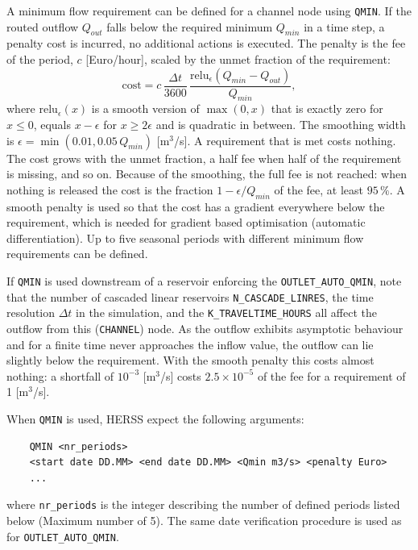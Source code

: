 \documentclass[a4paper, 12pt]{report}
\begin{document}
	A minimum flow requirement can be defined for a channel node using \texttt{QMIN}. If the
	routed outflow $Q_{out}$ falls below the required minimum $Q_{min}$ in a time step, a penalty cost is incurred, no additional actions is executed.
	The penalty is the fee of the period, $c$ [Euro/hour], scaled by the unmet fraction of the requirement:
	\begin{equation}
		\mathrm{cost} = c \, \frac{\Delta t}{3600} \, \frac{\mathrm{relu}_\epsilon(Q_{min} - Q_{out})}{Q_{min}},
	\end{equation}
	where $\mathrm{relu}_\epsilon(x)$ is a smooth version of $\max(0,x)$ that is exactly zero for $x \le 0$, equals $x - \epsilon$ for $x \ge 2\epsilon$ and is quadratic in between. The smoothing width is $\epsilon = \min(0.01, 0.05\,Q_{min})$ [m$^3$/s].
	A requirement that is met costs nothing. The cost grows with the unmet fraction, a half fee when half of the requirement is missing, and so on. Because of the smoothing, the full fee is not reached: when nothing is released the cost is the fraction $1 - \epsilon/Q_{min}$ of the fee, at least $95\,\%$.
	A smooth penalty is used so that the cost has a gradient everywhere below the requirement, which is needed for gradient based optimisation (automatic differentiation).
	Up to five seasonal periods with different minimum flow requirements can be defined.

    If \texttt{QMIN} is used downstream of a reservoir enforcing the \texttt{OUTLET\_AUTO\_QMIN}, note that the number of cascaded linear reservoirs \texttt{N\_CASCADE\_LINRES}, the time resolution $\Delta t$ in the simulation, and the \texttt{K\_TRAVELTIME\_HOURS} all affect the outflow from this (\texttt{CHANNEL}) node. As the outflow exhibits asymptotic behaviour and for a finite time never approaches the inflow value, the outflow can lie slightly below the requirement. With the smooth penalty this costs almost nothing: a shortfall of $10^{-3}$ [m$^3$/s] costs $2.5 \times 10^{-5}$ of the fee for a requirement of 1 [m$^3$/s].

    When \texttt{QMIN} is used, HERSS expect the following arguments:
    \begin{verbatim}
	QMIN <nr_periods>
    <start date DD.MM> <end date DD.MM> <Qmin m3/s> <penalty Euro>
	...
	\end{verbatim}
    where \texttt{nr\_periods} is the integer describing the number of defined periods listed below (Maximum number of 5). The same date verification procedure is used as for \texttt{OUTLET\_AUTO\_QMIN}.
\end{document}
